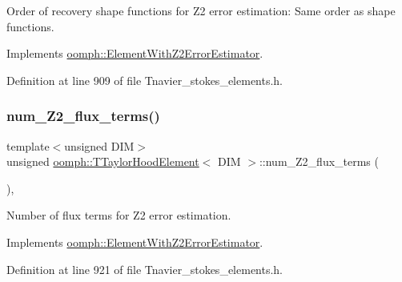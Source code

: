 Order of recovery shape functions for Z2 error estimation\+: Same order as shape functions. 



Implements \hyperlink{classoomph_1_1ElementWithZ2ErrorEstimator_af39480835bd3e0f6b2f4f7a9a4044798}{oomph\+::\+Element\+With\+Z2\+Error\+Estimator}.



Definition at line 909 of file Tnavier\+\_\+stokes\+\_\+elements.\+h.

\mbox{\label{classoomph_1_1TTaylorHoodElement_a17f2b01ed0325674c23b272ce217e66a}} 
\subsubsection{\texorpdfstring{num\+\_\+\+Z2\+\_\+flux\+\_\+terms()}{num\_Z2\_flux\_terms()}}
{\footnotesize\ttfamily template$<$unsigned D\+IM$>$ \\
unsigned \hyperlink{classoomph_1_1TTaylorHoodElement}{oomph\+::\+T\+Taylor\+Hood\+Element}$<$ D\+IM $>$\+::num\+\_\+\+Z2\+\_\+flux\+\_\+terms (\begin{DoxyParamCaption}{ }\end{DoxyParamCaption})\hspace{0.3cm}{\ttfamily [inline]}, {\ttfamily [virtual]}}



Number of \textquotesingle{}flux\textquotesingle{} terms for Z2 error estimation. 



Implements \hyperlink{classoomph_1_1ElementWithZ2ErrorEstimator_ae82c5728902e13da31be19c390fc28e3}{oomph\+::\+Element\+With\+Z2\+Error\+Estimator}.



Definition at line 921 of file Tnavier\+\_\+stokes\+\_\+elements.\+h.

\mbox{\label{classoomph_1_1TTaylorHoodElement_a88de8397e5afde8e3d5bb2639d1b91ff}} 
